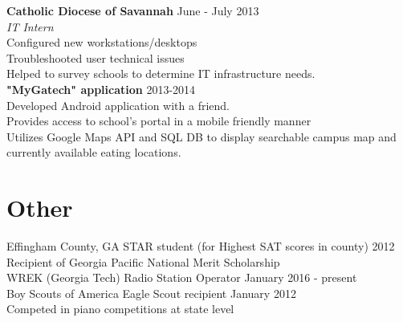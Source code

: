 \documentclass[line, margin]{res}
\begin{document}
\begin{resume}
\textbf{Catholic Diocese of Savannah} \hfill June - July 2013 \\
\textit{IT Intern} \\
Configured new workstations/desktops \\
Troubleshooted user technical issues \\
Helped to survey schools to determine IT infrastructure needs. \\

\textbf{"MyGatech" application } \hfill 2013-2014 \\
Developed Android application with a friend. \\
Provides access to school's portal in a mobile friendly manner \\
Utilizes Google Maps API and SQL DB to display searchable campus map and currently available eating locations. \\

\section{Other}
Effingham County, GA STAR student (for Highest SAT scores in county) \hfill 2012 \\
Recipient of Georgia Pacific National Merit Scholarship \\
WREK (Georgia Tech) Radio Station Operator  \hfill January 2016 - present \\
Boy Scouts of America Eagle Scout recipient \hfill January 2012 \\
Competed in piano competitions at state level

\end{resume}
\end{document}
